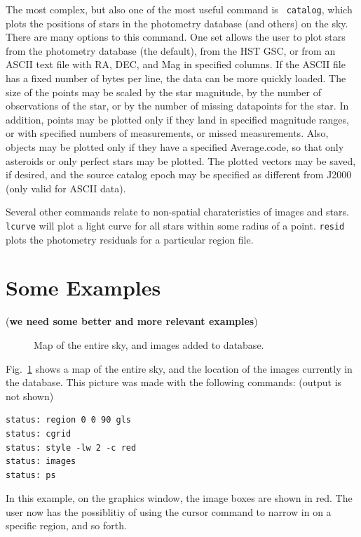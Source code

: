 \documentclass{article}
\newcommand{\note}[1]{({\bf #1})}
\begin{document}
The most complex, but also one of the most useful command is {\tt
  catalog}, which plots the positions of stars in the photometry
database (and others) on the sky.  There are many options to this
command.  One set allows the user to plot stars from the photometry
database (the default), from the HST GSC, or from an ASCII text file
with RA, DEC, and Mag in specified columns.  If the ASCII file has a
fixed number of bytes per line, the data can be more quickly loaded.
The size of the points may be scaled by the star magnitude, by the
number of observations of the star, or by the number of missing
datapoints for the star.  In addition, points may be plotted only if
they land in specified magnitude ranges, or with specified numbers of
measurements, or missed measurements.  Also, objects may be plotted
only if they have a specified Average.code, so that only asteroids or
only perfect stars may be plotted.  The plotted vectors may be saved,
if desired, and the source catalog epoch may be specified as different
from J2000 (only valid for ASCII data).

Several other commands relate to non-spatial charateristics of images
and stars.  {\tt lcurve} will plot a light curve for all stars within
some radius of a point.  {\tt resid} plots the photometry residuals
for a particular region file.  

\section{Some Examples}

\note{we need some better and more relevant examples}

\begin{figure}
\caption{\label{allsky} \small
  Map of the entire sky, and images added to database.  }
\end{figure}

Fig.~\ref{allsky} shows a map of the entire sky, and the location
of the images currently in the database.  This picture was made with
the following commands: (output is not shown) \\
\begin{verbatim}
status: region 0 0 90 gls
status: cgrid
status: style -lw 2 -c red 
status: images
status: ps
\end{verbatim}
In this example, on the graphics window, the image boxes are shown in
red.  The user now has the possiblitiy of using the cursor command to
narrow in on a specific region, and so forth.  
\end{document}
